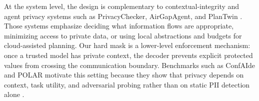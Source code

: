 At the system level, the design is complementary to contextual-integrity and
agent privacy systems such as PrivacyChecker, AirGapAgent, and PlanTwin
\cite{privacychecker,airgapagent,plantwin}.  Those systems emphasize deciding
what information flows are appropriate, minimizing access to private data, or
using local abstractions and budgets for cloud-assisted planning.  Our hard mask
is a lower-level enforcement mechanism: once a trusted model has private
context, the decoder prevents explicit protected values from crossing the
communication boundary.  Benchmarks such as ConfAIde and POLAR motivate this
setting because they show that privacy depends on context, task utility, and
adversarial probing rather than on static PII detection alone
\cite{confaide,polar_bench}.

